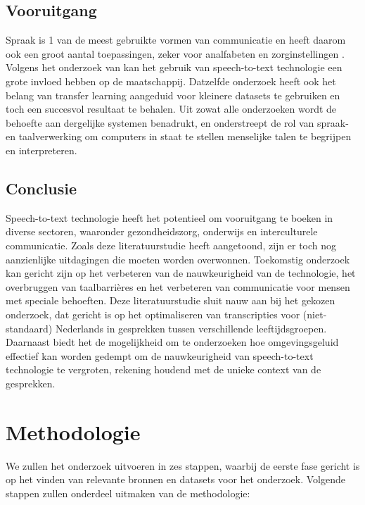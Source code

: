 \subsection{Vooruitgang}
Spraak is 1 van de meest gebruikte vormen van communicatie en heeft daarom ook een groot aantal toepassingen, zeker voor analfabeten en zorginstellingen \autocite{Arun2021}. Volgens het onderzoek van \textcite{Roepke2019} kan het gebruik van speech-to-text technologie een grote invloed hebben op de maatschappij. Datzelfde onderzoek heeft ook het belang van transfer learning aangeduid voor kleinere datasets te gebruiken en toch een succesvol resultaat te behalen. Uit zowat alle onderzoeken wordt de behoefte aan dergelijke systemen benadrukt, en onderstreept de rol van spraak- en taalverwerking om computers in staat te stellen menselijke talen te begrijpen en interpreteren.

\subsection{Conclusie}
Speech-to-text technologie heeft het potentieel om vooruitgang te boeken in diverse sectoren, waaronder gezondheidszorg, onderwijs en interculturele communicatie. Zoals deze literatuurstudie heeft aangetoond, zijn er toch nog aanzienlijke uitdagingen die moeten worden overwonnen. Toekomstig onderzoek kan gericht zijn op het verbeteren van de nauwkeurigheid van de technologie, het overbruggen van taalbarrières en het verbeteren van communicatie voor mensen met speciale behoeften.
Deze literatuurstudie sluit nauw aan bij het gekozen onderzoek, dat gericht is op het optimaliseren van transcripties voor (niet-standaard) Nederlands in gesprekken tussen verschillende leeftijdsgroepen. Daarnaast biedt het de mogelijkheid om te onderzoeken hoe omgevingsgeluid effectief kan worden gedempt om de nauwkeurigheid van speech-to-text technologie te vergroten, rekening houdend met de unieke context van de gesprekken.

\section{Methodologie}%
\label{sec:methodologie}

We zullen het onderzoek uitvoeren in zes stappen, waarbij de eerste fase gericht is op het vinden van relevante bronnen en datasets voor het onderzoek. Volgende stappen zullen onderdeel uitmaken van de methodologie:

